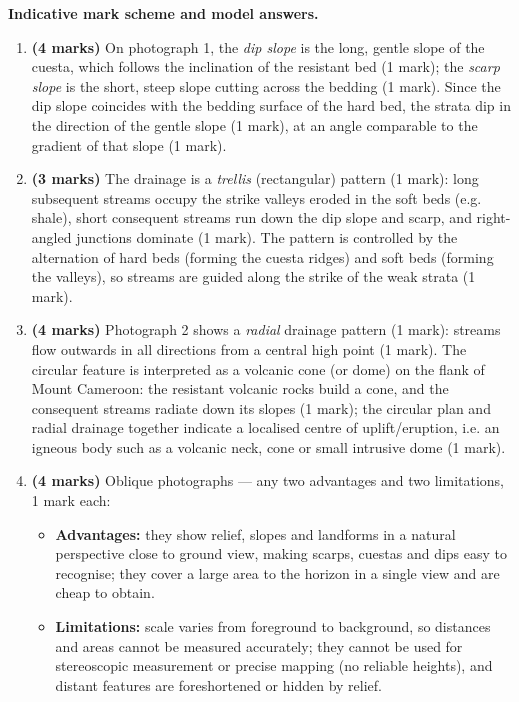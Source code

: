 \documentclass[11pt]{article}
\begin{document}
\begin{corrige}
\textbf{Indicative mark scheme and model answers.}
\begin{enumerate}
\item \textbf{(4 marks)} On photograph 1, the \emph{dip slope} is the long, gentle slope of the cuesta, which follows the inclination of the resistant bed (1 mark); the \emph{scarp slope} is the short, steep slope cutting across the bedding (1 mark). Since the dip slope coincides with the bedding surface of the hard bed, the strata dip in the direction of the gentle slope (1 mark), at an angle comparable to the gradient of that slope (1 mark).
\item \textbf{(3 marks)} The drainage is a \emph{trellis} (rectangular) pattern (1 mark): long subsequent streams occupy the strike valleys eroded in the soft beds (e.g. shale), short consequent streams run down the dip slope and scarp, and right-angled junctions dominate (1 mark). The pattern is controlled by the alternation of hard beds (forming the cuesta ridges) and soft beds (forming the valleys), so streams are guided along the strike of the weak strata (1 mark).
\item \textbf{(4 marks)} Photograph 2 shows a \emph{radial} drainage pattern (1 mark): streams flow outwards in all directions from a central high point (1 mark). The circular feature is interpreted as a volcanic cone (or dome) on the flank of Mount Cameroon: the resistant volcanic rocks build a cone, and the consequent streams radiate down its slopes (1 mark); the circular plan and radial drainage together indicate a localised centre of uplift/eruption, i.e. an igneous body such as a volcanic neck, cone or small intrusive dome (1 mark).
\item \textbf{(4 marks)} Oblique photographs — any two advantages and two limitations, 1 mark each:
\begin{itemize}
\item \textbf{Advantages:} they show relief, slopes and landforms in a natural perspective close to ground view, making scarps, cuestas and dips easy to recognise; they cover a large area to the horizon in a single view and are cheap to obtain.
\item \textbf{Limitations:} scale varies from foreground to background, so distances and areas cannot be measured accurately; they cannot be used for stereoscopic measurement or precise mapping (no reliable heights), and distant features are foreshortened or hidden by relief.
\end{itemize}
\end{enumerate}
\end{corrige}
\end{document}
